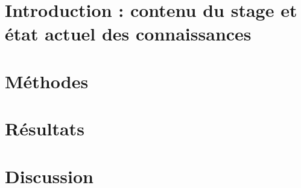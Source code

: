 \documentclass{beamer}
\begin{document}
\section{Introduction : contenu du stage et \'etat actuel des connaissances}
%

\section{M\'ethodes}
%
%

\section{R\'esultats}
%

\section{Discussion}
%

\end{document}
